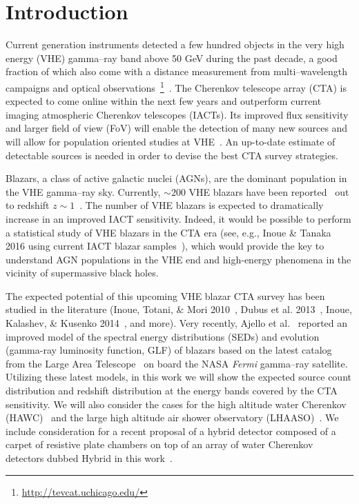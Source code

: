 \documentclass[final,5p]{elsarticle}
\begin{document}
\section{Introduction}\label{sec:Introduction}
Current generation instruments detected a few hundred objects in the very high energy (VHE) gamma--ray band above 50 GeV during the past decade, a good fraction of which also come with a distance measurement from multi--wavelength campaigns and optical observations~\footnote{\url{http://tevcat.uchicago.edu/}}~\cite{FermiCatalog3,FermiCatalog2,FermiCatalog1,VERITASCatalog,HESSCatalog}. The Cherenkov telescope array (CTA) is expected to come online within the next few years and outperform current imaging atmospheric Cherenkov telescopes (IACTs). Its improved flux sensitivity and larger field of view (FoV) will enable the detection of many new sources and will allow for population oriented studies at VHE~\cite{Dubus2013}. An up-to-date estimate of detectable sources is needed in order to devise the best CTA survey strategies.

Blazars, a class of active galactic nuclei (AGNs), are the dominant population in the VHE gamma--ray sky. Currently, $\sim200$ VHE blazars have been reported~\cite{Fermi2FHL} out to redshift $z\sim1$~\cite{Tanaka2013,Ahnen2015,Abeysekara2015}. The number of VHE blazars is expected to dramatically increase in an improved IACT sensitivity. Indeed, it would be possible to perform a statistical study of VHE blazars in the CTA era (see, e.g., Inoue \& Tanaka 2016 using current IACT blazar samples~\cite{Inoue2016}), which would provide the key to understand AGN populations in the VHE end and high-energy phenomena in the vicinity of supermassive black holes. 

The expected potential of this upcoming VHE blazar CTA survey has been studied in the literature (Inoue, Totani, \& Mori 2010~\cite{Inoue2010}, Dubus et al. 2013~\cite{Dubus2013}, Inoue, Kalashev, \& Kusenko 2014~\cite{Yoshi2ndGamma}, and more). Very recently, Ajello et al.~\cite{Ajello2015} reported an improved model of the spectral energy distributions (SEDs) and evolution (gamma-ray luminosity function, GLF) of blazars based on the latest catalog from the Large Area Telescope~\cite{LATFermi} on board the NASA {\it Fermi} gamma--ray satellite. Utilizing these latest models, in this work we will show the expected source count distribution and redshift distribution at the energy bands covered by the CTA sensitivity. We will also consider the cases for the high altitude water Cherenkov (HAWC)~\cite{HAWCDesign} and the large high altitude air shower observatory (LHAASO)~\cite{LHASSODesign,LHASSODesign_2,LHASSOProspect}. We include consideration for a recent proposal of a hybrid detector composed of a carpet of resistive plate chambers on top of an array of water Cherenkov detectors dubbed Hybrid in this work~\cite{Hybrid}.
\end{document}
